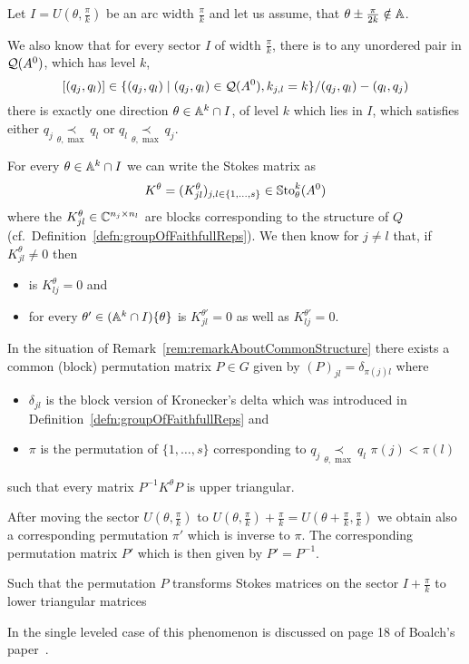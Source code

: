 Let $I=U(\theta,\frac{\pi}{k})$ be an arc width $\frac{\pi}{k}$ and let us
assume, that $\theta\pm\frac{\pi}{2k}\notin\mathbb{A}$.
\begin{rem}\label{rem:remarkAboutCommonStructure}
  We also know that for every sector $I$ of width $\frac{\pi}{k}$, there is to
  any unordered pair in $\mathcal{Q}(A^0)$, which has level $k$,
  \[
    [(q_j,q_l)]\in
    \{(q_j,q_l)\mid(q_j,q_l)\in \mathcal{Q}(A^0), k_{j,l}=k\}/(q_j,q_l)-(q_l,q_j)
  \]
  there is exactly one direction $\theta\in\mathbb{A}^{k}\cap I$, of level $k$ which
  lies in $I$, which satisfies either $q_j\underset{\theta,\max}{\prec}q_l$ or
  $q_l\underset{\theta,\max}{\prec}q_j$.

  For every $\theta\in\mathbb{A}^k\cap I$ we can write the Stokes matrix as
  \[
    K^\theta=(K^\theta_{jl})_{j,l\in\{1,\dots,s\}}\in\operatorname{\mathbb{S}to}_\theta^k(A^0)
  \]
  where the $K^\theta_{jl}\in\mathbb{C}^{n_j\times n_l}$ are blocks corresponding to
  the structure of $Q$ (cf.\ Definition~\ref{defn:groupOfFaithfullReps}).
  We then know for $j\neq l$ that, if $K^\theta_{jl}\neq0$ then
  \begin{itemize}
    \item is $K^\theta_{lj}=0$ and
    \item for every $\theta'\in(\mathbb{A}^k\cap I)\{\theta\}$ is $K^{\theta'}_{jl}=0$
      as well as $K^{\theta'}_{lj}=0$.
  \end{itemize}
\end{rem}
\begin{rem}
  In the situation of Remark~\ref{rem:remarkAboutCommonStructure}
  there exists a common (block) permutation matrix $P\in G$ given by
  $(P)_{jl}=\delta_{\pi(j)l}$ where
  \begin{itemize}
    \item $\delta_{jl}$ is the block version of Kronecker's delta which was
      introduced in Definition~\ref{defn:groupOfFaithfullReps} and
    \item $\pi$ is the permutation of $\{1,\dots,s\}$ corresponding to
      $q_j\underset{\theta,\max}{\prec}q_l$ \Leftrightarrow{} $\pi(j)<\pi(l)$
  \end{itemize}
  such that every matrix $P^{-1}K^{\theta}P$ is upper triangular.
  \begin{s-rem}
    After moving the sector $U(\theta,\frac{\pi}{k})$ to
    $U(\theta,\frac{\pi}{k})+\frac{\pi}{k}
    =U(\theta+\frac{\pi}{k},\frac{\pi}{k})$ we obtain also a corresponding
    permutation $\pi'$ which is inverse to $\pi$.
    The corresponding permutation matrix $P'$ which is then given by
    $P'=P^{-1}$.

    Such that the permutation $P$ transforms Stokes matrices on the sector
    $I+\frac{\pi}{k}$ to lower triangular matrices
  \end{s-rem}
  In the single leveled case of this phenomenon is discussed on page 18 of
  Boalch's paper~\cite{boalch}.
\end{rem}

